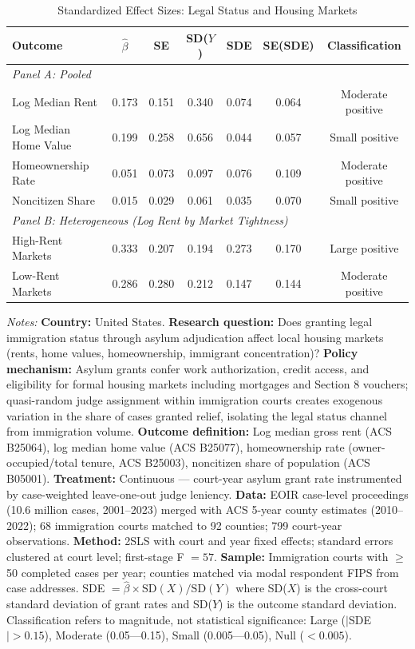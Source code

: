 \begin{table}[htbp]
\centering
\caption{Standardized Effect Sizes: Legal Status and Housing Markets}\label{tab:sde}
\begin{tabular}{lcccccc}
\hline\hline
Outcome & $\hat{\beta}$ & SE & SD($Y$) & SDE & SE(SDE) & Classification \\
\hline
\multicolumn{7}{l}{\textit{Panel A: Pooled}} \\
Log Median Rent & 0.173 & 0.151 & 0.340 & 0.074 & 0.064 & Moderate positive \\
Log Median Home Value & 0.199 & 0.258 & 0.656 & 0.044 & 0.057 & Small positive \\
Homeownership Rate & 0.051 & 0.073 & 0.097 & 0.076 & 0.109 & Moderate positive \\
Noncitizen Share & 0.015 & 0.029 & 0.061 & 0.035 & 0.070 & Small positive \\
\hline
\multicolumn{7}{l}{\textit{Panel B: Heterogeneous (Log Rent by Market Tightness)}} \\
High-Rent Markets & 0.333 & 0.207 & 0.194 & 0.273 & 0.170 & Large positive \\
Low-Rent Markets & 0.286 & 0.280 & 0.212 & 0.147 & 0.144 & Moderate positive \\
\hline\hline
\end{tabular}
\begin{tablenotes}\small
\item \textit{Notes:} \textbf{Country:} United States. \textbf{Research question:} Does granting legal immigration status through asylum adjudication affect local housing markets (rents, home values, homeownership, immigrant concentration)? \textbf{Policy mechanism:} Asylum grants confer work authorization, credit access, and eligibility for formal housing markets including mortgages and Section 8 vouchers; quasi-random judge assignment within immigration courts creates exogenous variation in the share of cases granted relief, isolating the legal status channel from immigration volume. \textbf{Outcome definition:} Log median gross rent (ACS B25064), log median home value (ACS B25077), homeownership rate (owner-occupied/total tenure, ACS B25003), noncitizen share of population (ACS B05001). \textbf{Treatment:} Continuous --- court-year asylum grant rate instrumented by case-weighted leave-one-out judge leniency. \textbf{Data:} EOIR case-level proceedings (10.6 million cases, 2001--2023) merged with ACS 5-year county estimates (2010--2022); 68 immigration courts matched to 92 counties; 799 court-year observations. \textbf{Method:} 2SLS with court and year fixed effects; standard errors clustered at court level; first-stage F $= 57$. \textbf{Sample:} Immigration courts with $\geq$ 50 completed cases per year; counties matched via modal respondent FIPS from case addresses. SDE $= \hat{\beta} \times \text{SD}(X) / \text{SD}(Y)$ where SD($X$) is the cross-court standard deviation of grant rates and SD($Y$) is the outcome standard deviation. Classification refers to magnitude, not statistical significance: Large ($|$SDE$| > 0.15$), Moderate (0.05---0.15), Small (0.005---0.05), Null ($< 0.005$).
\end{tablenotes}
\end{table}
